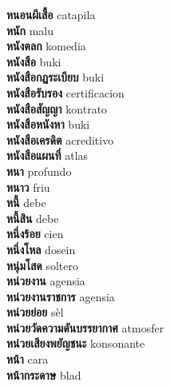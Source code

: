 \textbf{ หนอนผีเสื้อ  } catapila \\
\textbf{ หนัก  } malu \\
\textbf{ หนังตลก  } komedia \\
\textbf{ หนังสือ  } buki \\
\textbf{ หนังสือกฏระเบียบ  } buki \\
\textbf{ หนังสือรับรอง  } certificacion \\
\textbf{ หนังสือสัญญา  } kontrato \\
\textbf{ หนังสือหนังหา  } buki \\
\textbf{ หนังสือเครดิต  } acreditivo \\
\textbf{ หนังสือแผนที่  } atlas \\
\textbf{ หนา  } profundo \\
\textbf{ หนาว  } friu \\
\textbf{ หนี้  } debe \\
\textbf{ หนี้สิน  } debe \\
\textbf{ หนึ่งร้อย  } cien \\
\textbf{ หนึ่งโหล  } dosein \\
\textbf{ หนุ่มโสด  } soltero \\
\textbf{ หน่วยงาน  } agensia \\
\textbf{ หน่วยงานราชการ  } agensia \\
\textbf{ หน่วยย่อย  } sèl \\
\textbf{ หน่วยวัดความดันบรรยากาศ  } atmosfer \\
\textbf{ หน่วยเสียงพยัญชนะ  } konsonante \\
\textbf{ หน้า  } cara \\
\textbf{ หน้ากระดาษ  } blad \\
